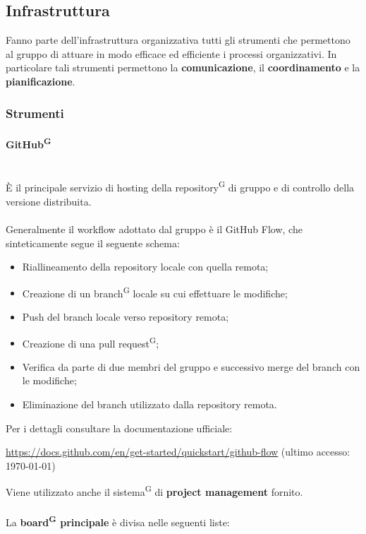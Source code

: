 \documentclass[8pt]{article}
\newcommand{\glossterm}[1]{#1\textsuperscript{G}} %
\newcommand{\subsubsubsection}[1]{\paragraph{#1}\mbox{}\\}
\begin{document}
\subsection{Infrastruttura}\label{sec:infrastruttura}
Fanno parte dell'infrastruttura organizzativa tutti gli strumenti che permettono al gruppo di attuare in modo efficace ed efficiente i processi organizzativi. In particolare tali strumenti permettono la \textbf{comunicazione}, il \textbf{coordinamento} e la \textbf{pianificazione}.

\subsubsection{Strumenti}

\subsubsubsection{\glossterm{GitHub}}
È il principale servizio di hosting della \glossterm{repository} di gruppo e di controllo della versione distribuita. 
\\\\
Generalmente il workflow adottato dal gruppo è il GitHub Flow, che sinteticamente segue il seguente schema:
\begin{itemize}
  \item Riallineamento della repository locale con quella remota;
  \item Creazione di un \glossterm{branch} locale su cui effettuare le modifiche;
  \item Push del branch locale verso repository remota;
  \item Creazione di una \glossterm{pull request};
  \item Verifica da parte di due membri del gruppo e successivo merge del branch con le modifiche;
  \item Eliminazione del branch utilizzato dalla repository remota.
\end{itemize}
Per i dettagli consultare la documentazione ufficiale: 
\begin{center}
 \href{https://docs.github.com/en/get-started/quickstart/github-flow}{{https://docs.github.com/en/get-started/quickstart/github-flow}}
    (ultimo accesso: \today)
\end{center}
\medskip
Viene utilizzato anche il \glossterm{sistema} di \textbf{project management} fornito. \\\\
La \textbf{\glossterm{board} principale} è divisa nelle seguenti liste:
\end{document}

